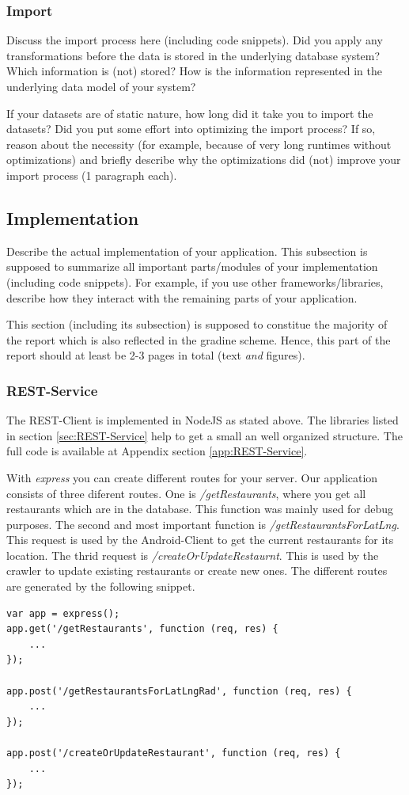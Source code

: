 \subsubsection{Import}

Discuss the import process here (including code snippets). Did you apply any
transformations before the data is stored in the underlying database system?
Which information is (not) stored? How is the information represented in the
underlying data model of your system?

If your datasets are of static nature, how long did it take you to import the
datasets? Did you put some effort into optimizing the import process? If so,
reason about the necessity (for example, because of very long runtimes without
optimizations) and briefly describe why the optimizations did (not) improve your
import process (1 paragraph each).

\subsection{Implementation}

Describe the actual implementation of your application. This subsection is
supposed to summarize all important parts/modules of your implementation
(including code snippets). For example, if you use other frameworks/libraries,
describe how they interact with the remaining parts of your application.

This section (including its subsection) is supposed to constitue the majority
of the report which is also reflected in the gradine scheme. Hence, this part of
the report should at least be 2-3 pages in total (text \emph{and} figures).

\subsubsection{REST-Service}
The REST-Client is implemented in NodeJS as stated above. The libraries listed in section \ref{sec:REST-Service} help to get a small an well organized structure. The full code is available at Appendix section \ref{app:REST-Service}.

With \textit{express} you can create different routes for your server. Our application consists of three diferent routes. One is \textit{/getRestaurants}, where you get all restaurants which are in the database. This function was mainly used for debug purposes. The second and most important function is \textit{/getRestaurantsForLatLng}. This request is used by the Android-Client to get the current restaurants for its location. The thrid request is \textit{/createOrUpdateRestaurnt}. This is used by the crawler to update existing restaurants or create new ones. The different routes are generated by the following snippet.
\begin{lstlisting}
var app = express();
app.get('/getRestaurants', function (req, res) {
	...
});

app.post('/getRestaurantsForLatLngRad', function (req, res) {
	...
});

app.post('/createOrUpdateRestaurant', function (req, res) {
	...
});
\end{lstlisting}

